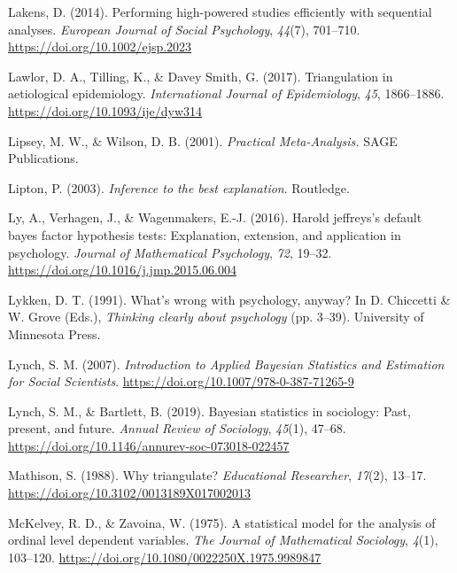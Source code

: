 \documentclass[
]{interact}
\newlength{\cslhangindent}
\newlength{\cslentryspacingunit} %
\newenvironment{CSLReferences}[2] %
 {%
  \setlength{\parindent}{0pt}
  \ifodd #1
  \let\oldpar\par
  \def\par{\hangindent=\cslhangindent\oldpar}
  \fi
  \setlength{\parskip}{#2\cslentryspacingunit}
 }%
 {}
\begin{document}
\begin{CSLReferences}{1}{0}
\leavevmode{}%
Lakens, D. (2014). Performing high-powered studies efficiently with
sequential analyses. \emph{European Journal of Social Psychology},
\emph{44}(7), 701--710. \url{https://doi.org/10.1002/ejsp.2023}

\leavevmode{}%
Lawlor, D. A., Tilling, K., \& Davey Smith, G. (2017). Triangulation in
aetiological epidemiology. \emph{International Journal of Epidemiology},
\emph{45}, 1866--1886. \url{https://doi.org/10.1093/ije/dyw314}

\leavevmode{}%
Lipsey, M. W., \& Wilson, D. B. (2001). \emph{Practical
{M}eta-{A}nalysis.} SAGE Publications.

\leavevmode{}%
Lipton, P. (2003). \emph{Inference to the best explanation}. Routledge.

\leavevmode{}%
Ly, A., Verhagen, J., \& Wagenmakers, E.-J. (2016). Harold jeffreys's
default bayes factor hypothesis tests: Explanation, extension, and
application in psychology. \emph{Journal of Mathematical Psychology},
\emph{72}, 19--32. \url{https://doi.org/10.1016/j.jmp.2015.06.004}

\leavevmode{}%
Lykken, D. T. (1991). What's wrong with psychology, anyway? In D.
Chiccetti \& W. Grove (Eds.), \emph{Thinking clearly about psychology}
(pp. 3--39). University of Minnesota Press.

\leavevmode{}%
Lynch, S. M. (2007). \emph{Introduction to {Applied} {Bayesian}
{Statistics} and {Estimation} for {Social} {Scientists}}.
\url{https://doi.org/10.1007/978-0-387-71265-9}

\leavevmode{}%
Lynch, S. M., \& Bartlett, B. (2019). Bayesian statistics in sociology:
Past, present, and future. \emph{Annual Review of Sociology},
\emph{45}(1), 47--68.
\url{https://doi.org/10.1146/annurev-soc-073018-022457}

\leavevmode{}%
Mathison, S. (1988). Why triangulate? \emph{Educational Researcher},
\emph{17}(2), 13--17. \url{https://doi.org/10.3102/0013189X017002013}

\leavevmode{}%
McKelvey, R. D., \& Zavoina, W. (1975). A statistical model for the
analysis of ordinal level dependent variables. \emph{The Journal of
Mathematical Sociology}, \emph{4}(1), 103--120.
\url{https://doi.org/10.1080/0022250X.1975.9989847}


\end{CSLReferences}
\end{document}
